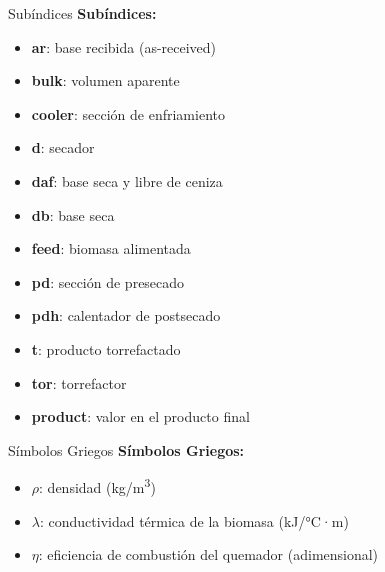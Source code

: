 \documentclass[main.tex]{subfiles}
\begin{document}
\begin{frame}{Subíndices}
\footnotesize
\textbf{Subíndices:}
\begin{itemize}
  \item \textbf{ar}: base recibida (as-received)
  \item \textbf{bulk}: volumen aparente
  \item \textbf{cooler}: sección de enfriamiento
  \item \textbf{d}: secador
  \item \textbf{daf}: base seca y libre de ceniza
  \item \textbf{db}: base seca
  \item \textbf{feed}: biomasa alimentada
  \item \textbf{pd}: sección de presecado
  \item \textbf{pdh}: calentador de postsecado
  \item \textbf{t}: producto torrefactado
  \item \textbf{tor}: torrefactor
  \item \textbf{product}: valor en el producto final
\end{itemize}


\end{frame}

\begin{frame}{Símbolos Griegos}
    \textbf{Símbolos Griegos:}
\begin{itemize}
  \item $\rho$: densidad (kg/m\textsuperscript{3})
  \item $\lambda$: conductividad térmica de la biomasa (kJ/°C·m)
  \item $\eta$: eficiencia de combustión del quemador (adimensional)
\end{itemize}
\end{frame}
\end{document}
